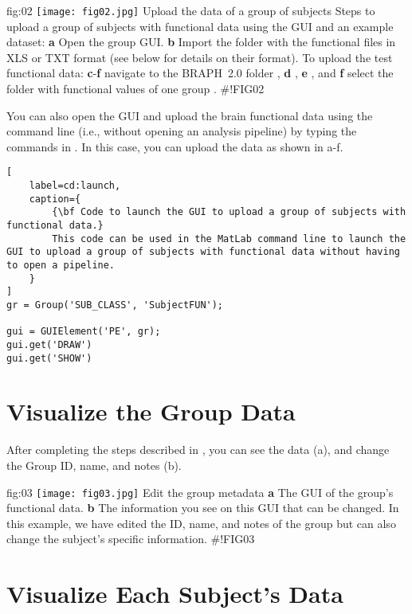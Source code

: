 \documentclass[justified]{tufte-handout}
\begin{document}
	{fig:02}
	{
	\texttt{[image: fig02.jpg]}
	}
	{Upload the data of a group of subjects}
	{
	Steps to upload a group of subjects with functional data using the GUI and an example dataset: 
	{\bf a} Open the group GUI.
	{\bf b} Import the folder with the functional files in XLS or TXT format (see below for details on their format).
	To upload the test functional data:
	{\bf c}-{\bf f} navigate to the BRAPH~2.0 folder , {\bf d} ,  {\bf e} , and {\bf f} select the folder with functional values of one group .
	}
#!FIG02
	
\begin{tcolorbox}[
	title=GUI launch from command line
]
You can also open the GUI and upload the brain functional data using the command line (i.e., without opening an analysis pipeline) by typing the commands in . In this case, you can upload the data as shown in a-f.
%
\begin{lstlisting}[
	label=cd:launch,
	caption={
		{\bf Code to launch the GUI to upload a group of subjects with functional data.}
		This code can be used in the MatLab command line to launch the GUI to upload a group of subjects with functional data without having to open a pipeline.
	}
]
gr = Group('SUB_CLASS', 'SubjectFUN');

gui = GUIElement('PE', gr);
gui.get('DRAW')
gui.get('SHOW')
\end{lstlisting}
\end{tcolorbox}

\section{Visualize the Group Data}

After completing the steps described in , you can see the data (a), and change the Group ID, name, and notes (b). 

	{fig:03}
	{
	\texttt{[image: fig03.jpg]}
	}
	{Edit the group metadata}
	{ 
	{\bf a} The GUI of the group's functional data. 
	{\bf b} The information you see on this GUI that can be changed. In this example, we have edited the ID, name, and notes of the group but can also change the subject's specific information.
	}
#!FIG03

\section{Visualize Each Subject's Data}
\end{document}

